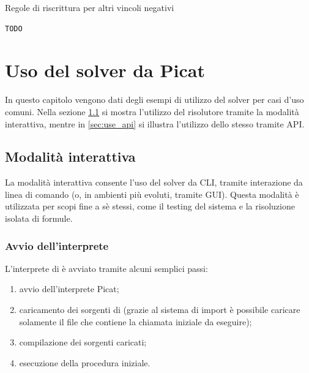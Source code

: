 \documentclass[12pt,a4paper,openright]{book} %
\begin{document}
\begin{algorithm}[H]
	\caption{Regole di riscrittura per altri vincoli negativi}
	\label{alg:othernegatives_constraints}
\end{algorithm}
\begin{verbatim}
TODO
\end{verbatim}



\chapter{Uso del solver \lset{} da Picat}
\label{ch:use}


In questo capitolo vengono dati degli esempi di utilizzo del solver per
casi d'uso comuni. Nella sezione \ref{sec:use_interactive} si mostra
l'utilizzo del risolutore tramite la modalità interattiva, mentre in
\ref{sec:use_api} si illustra l'utilizzo dello stesso tramite API.

\section{Modalità interattiva}
\label{sec:use_interactive}

La modalità interattiva consente l'uso del solver da CLI, tramite
interazione da linea di comando (o, in ambienti più evoluti, tramite
GUI). Questa modalità è utilizzata per scopi fine a sè stessi, come il
testing del sistema e la risoluzione isolata di formule.

\subsection{Avvio dell'interprete}

L'interprete di \lset{} è avviato tramite alcuni semplici passi:
\begin{enumerate}
	\item avvio dell'interprete Picat;
	\item caricamento dei sorgenti di \lset{} (grazie al sistema
          di import è possibile caricare solamente il file che
          contiene la chiamata iniziale da eseguire);
	\item compilazione dei sorgenti caricati;
	\item esecuzione della procedura iniziale.
\end{enumerate}
\end{document}
